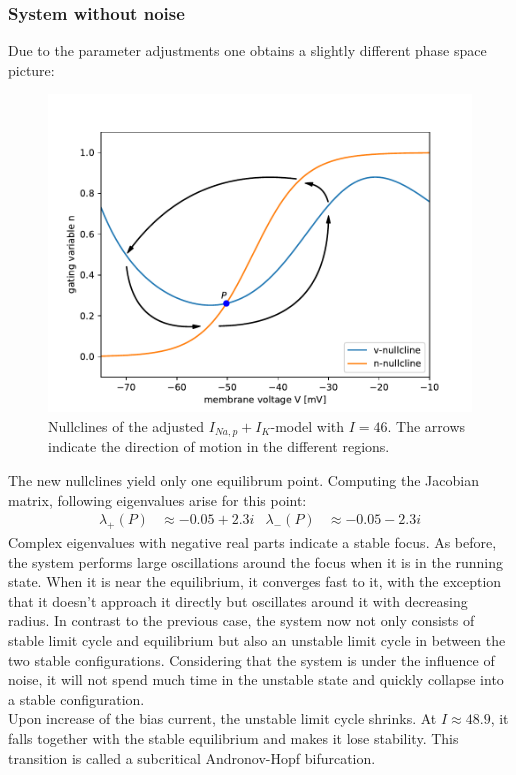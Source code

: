 \documentclass[12pt,a4paper]{article}
\begin{document}
\subsubsection{System without noise}\label{anhopfwon}
Due to the parameter adjustments one obtains a slightly different phase space picture:
\begin{figure}[H]
	\centering
	\includegraphics[scale=0.5]{inapikanhopfnc.pdf}\caption{Nullclines of the adjusted $I_{Na,p}+I_K$-model with $I=46$. The arrows indicate the direction of motion in the different regions.}
	\label{anhopfnc}
\end{figure}
The new nullclines yield only one equilibrum point. Computing the Jacobian matrix, following eigenvalues arise for this point:
\begin{align*}
\lambda_+(P)&\approx -0.05 + 2.3i& \lambda_-(P)&\approx -0.05 - 2.3i
\end{align*}
Complex eigenvalues with negative real parts indicate a stable focus. As before, the system performs large oscillations around the focus when it is in the running state. When it is near the equilibrium, it converges fast to it, with the exception that it doesn't approach it directly but oscillates around it with decreasing radius.
In contrast to the previous case, the system now not only consists of stable limit cycle and equilibrium but also an unstable limit cycle in between the two stable configurations. Considering that the system is under the influence of noise, it will not spend much time in the unstable state and quickly collapse into a stable configuration.\\
Upon increase of the bias current, the unstable limit cycle shrinks. At $I\approx 48.9$, it falls together with the stable equilibrium and makes it lose stability. This transition is called a subcritical Andronov-Hopf bifurcation.\\
\end{document}
